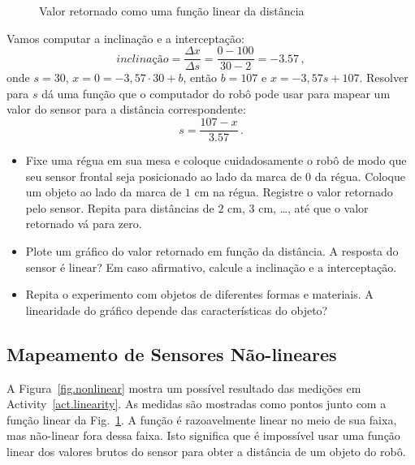 \begin{figure}
\begin{center}
\caption{Valor retornado como uma função linear da distância}\label{fig.linear}
\end{center}
\end{figure}

Vamos computar a inclinação e a interceptação:
\[
\mathit{inclinação} = \frac{\Delta x}{\Delta s} = \frac{0-100}{30-2}=-3.57\,,
\]
onde $s=30$, $x=0=-3,57\cdot 30+b$, então $b=107$ e $x = -3,57 s + 107$. Resolver para $s$ dá uma função que o computador do robô pode usar para mapear um valor do sensor para a distância correspondente:
\[
s = \frac{107-x}{3.57}\,.
\]

\begin{framed}
\begin{itemize}
\item Fixe uma régua em sua mesa e coloque cuidadosamente o robô de modo que seu sensor frontal seja posicionado ao lado da marca de $0$ da régua. Coloque um objeto ao lado da marca de $1$ cm na régua. Registre o valor retornado pelo sensor. Repita para distâncias de $2$ cm, $3$ cm, \ldots, até que o valor retornado vá para zero.
\item Plote um gráfico do valor retornado em função da distância. A resposta do sensor é linear? Em caso afirmativo, calcule a inclinação e a interceptação.
\item Repita o experimento com objetos de diferentes formas e materiais. A linearidade do gráfico depende das características do objeto?
\end{itemize}
\end{framed}

\subsection{Mapeamento de Sensores Não-lineares}

A Figura~\ref{fig.nonlinear} mostra um possível resultado das medições em Activity~\ref{act.linearity}. As medidas são mostradas como pontos junto com a função linear da Fig.~\ref{fig.linear}. A função é razoavelmente linear no meio de sua faixa, mas não-linear fora dessa faixa. Isto significa que é impossível usar uma função linear dos valores brutos do sensor para obter a distância de um objeto do robô.

